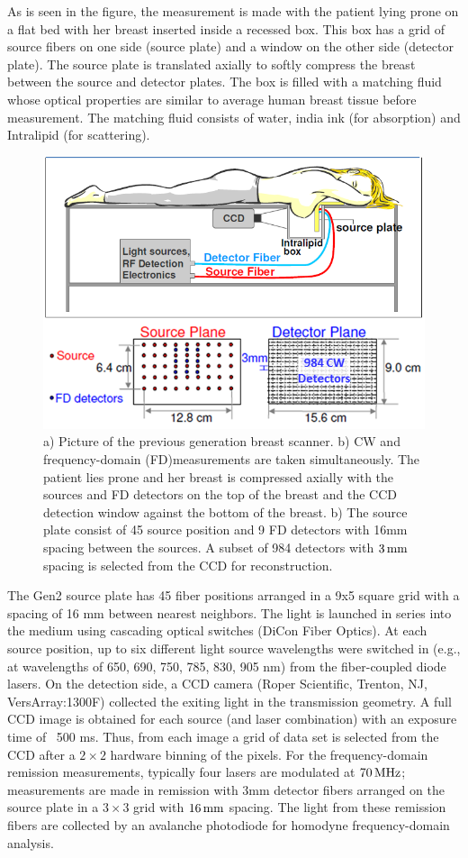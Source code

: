 As is seen in the figure, the measurement is made with the patient lying prone on a flat bed with her breast inserted inside a recessed box. This box has a grid of source fibers on one side (source plate) and a window on the other side (detector plate). The source plate is translated axially to softly compress the breast between the source and detector plates. The box is filled with a matching fluid whose optical properties are similar to average human breast tissue before measurement. The matching fluid consists of water, india ink (for absorption) and Intralipid (for scattering). 
\begin{figure}[ht]
\centering
\includegraphics[width=14cm]{./figures/4_Gen3/gen2schem.png}
\caption{a) Picture of the previous generation breast scanner. b) CW and frequency-domain (FD)measurements are taken simultaneously. The patient lies prone and her breast is compressed axially with the sources and FD detectors on the top of the breast and the CCD detection window against the bottom of the breast. b) The source plate consist of 45 source position and 9 FD detectors with 16mm spacing between the sources. A subset of 984 detectors with $3\,{\rm mm}$ spacing is selected from the CCD for reconstruction.}
\label{fig:gen2schem}
\end{figure}
The Gen2 source plate has 45 fiber positions arranged in a 9x5 square grid with a spacing of 16 mm between nearest neighbors. The light is launched in series into the medium using cascading optical switches (DiCon Fiber Optics). At each source position, up to six different light source wavelengths were switched in (e.g., at wavelengths of 650, 690, 750, 785, 830, 905 nm) from the fiber-coupled diode lasers. On the detection side, a CCD camera (Roper Scientific, Trenton, NJ, VersArray:1300F) collected the exiting light in the transmission geometry. A full CCD image is obtained for each source (and laser combination) with an exposure time of ~500 ms. Thus, from each image a grid of data set is selected from the CCD after a $2\times 2$ hardware binning of the pixels. For the frequency-domain remission measurements, typically four lasers are modulated at $70\,{\rm MHz}$; measurements are made in remission with 3mm detector fibers arranged on the source plate in a $3\times3$ grid with $16\,{\rm mm}$ spacing. The light from these remission fibers are collected by an avalanche photodiode for homodyne frequency-domain analysis.

